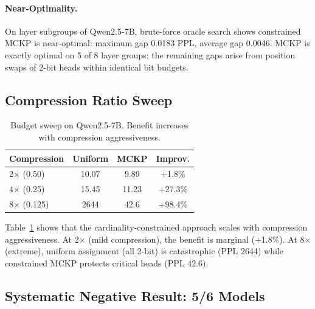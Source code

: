 \documentclass[11pt,a4paper]{article}
\begin{document}
\paragraph{Near-Optimality.}
On layer subgroups of Qwen2.5-7B, brute-force oracle search shows constrained MCKP is near-optimal: maximum gap 0.0183 PPL, average gap 0.0046. MCKP is exactly optimal on 5 of 8 layer groups; the remaining gaps arise from position swaps of 2-bit heads within identical bit budgets.

\subsection{Compression Ratio Sweep}
\label{sec:budget}

\begin{table}[t]
\centering
\small
\begin{tabular}{lccc}
\toprule
\textbf{Compression} & \textbf{Uniform} & \textbf{MCKP} & \textbf{Improv.} \\
\midrule
2$\times$ (0.50) & 10.07 &  9.89 & +1.8\% \\
4$\times$ (0.25) & 15.45 & 11.23 & +27.3\% \\
8$\times$ (0.125) & 2644 & 42.6 & +98.4\% \\
\bottomrule
\end{tabular}
\caption{Budget sweep on Qwen2.5-7B. Benefit increases with compression aggressiveness.}
\label{tab:budget}
\end{table}

Table~\ref{tab:budget} shows that the cardinality-constrained approach scales with compression aggressiveness. At 2$\times$ (mild compression), the benefit is marginal (+1.8\%). At 8$\times$ (extreme), uniform assignment (all 2-bit) is catastrophic (PPL 2644) while constrained MCKP protects critical heads (PPL 42.6).

\subsection{Systematic Negative Result: 5/6 Models}
\label{sec:negative}
\end{document}
